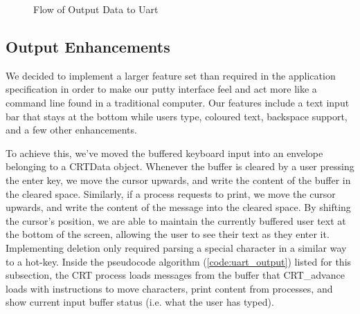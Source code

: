 \documentclass[12pt]{report}
\begin{document}
    \begin{figure}
        \centering
        \caption{Flow of Output Data to Uart}
    \end{figure}

\subsection{Output Enhancements}
\label{sec:outputEnhancements}
    We decided to implement a larger feature set than required in the
    application specification in order to make our putty interface feel and act
    more like a command line found in a traditional computer. Our features
    include a text input bar that stays at the bottom while users type, coloured
    text, backspace support, and a few other enhancements.

    To achieve this, we've moved the buffered keyboard input into an envelope
    belonging to a CRTData object. Whenever the buffer is cleared by a
    user pressing the enter key, we move the cursor upwards, and write
    the content of the buffer in the cleared space. Similarly, if a process
    requests to print, we move the cursor upwards, and write the content of the
    message into the cleared space. By shifting the cursor's position, we are
    able to maintain the currently buffered user text at the bottom of the
    screen, allowing the user to see their text as they enter it. Implementing
    deletion only required parsing a special character in a similar way to a
    hot-key. Inside the pseudocode algorithm (\ref{code:uart_output}) listed for
    this subsection, the CRT process loads messages from the buffer that
    CRT\_advance loads with instructions to move characters, print content from
    processes, and show current input buffer status (i.e. what the user has
    typed).
\end{document}
